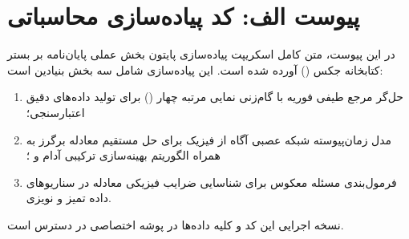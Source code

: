\chapter*{پیوست الف: کد پیاده‌سازی محاسباتی}
{}

در این پیوست، متن کامل اسکریپت پیاده‌سازی پایتون بخش عملی پایان‌نامه بر بستر کتابخانه جکس () آورده شده است. این پیاده‌سازی شامل سه بخش بنیادین است:
\begin{enumerate}
\item حل‌گر مرجع طیفی فوریه با گام‌زنی نمایی مرتبه چهار () برای تولید داده‌های دقیق اعتبارسنجی؛
\item مدل زمان‌پیوسته شبکه عصبی آگاه از فیزیک برای حل مستقیم معادله برگرز به همراه الگوریتم بهینه‌سازی ترکیبی آدام و ؛
\item فرمول‌بندی مسئله معکوس برای شناسایی ضرایب فیزیکی معادله در سناریوهای داده تمیز و نویزی.
\end{enumerate}

نسخه اجرایی این کد و کلیه داده‌ها در پوشه اختصاصی  در دسترس است.

\begin{singlespace}
\setLTR

\setRTL
\end{singlespace}
